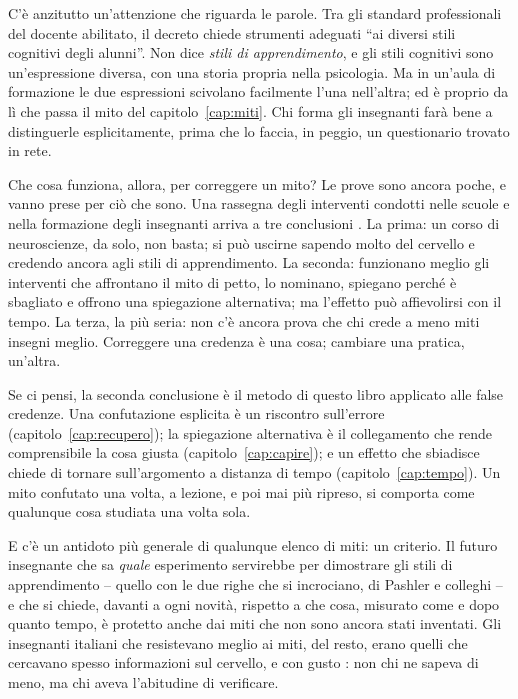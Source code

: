 C'è anzitutto un'attenzione che riguarda le parole. Tra gli standard
professionali del docente abilitato, il decreto chiede strumenti
adeguati \enquote{ai diversi stili cognitivi degli alunni}. Non dice
\emph{stili di apprendimento}, e gli stili cognitivi sono
un'espressione diversa, con una storia propria nella psicologia. Ma in
un'aula di formazione le due espressioni scivolano facilmente l'una
nell'altra; ed è proprio da lì che passa il mito del
capitolo~\ref{cap:miti}. Chi forma gli insegnanti farà bene a
distinguerle esplicitamente, prima che lo faccia, in peggio, un
questionario trovato in rete.

Che cosa funziona, allora, per correggere un mito? Le prove sono
ancora poche, e vanno prese per ciò che sono. Una rassegna degli
interventi condotti nelle scuole e nella formazione degli insegnanti
arriva a tre conclusioni \parencite{rousseau2021}. La prima: un corso
di neuroscienze, da solo, non basta; si può uscirne sapendo molto del
cervello e credendo ancora agli stili di apprendimento. La seconda:
funzionano meglio gli interventi che affrontano il mito di petto, lo
nominano, spiegano perché è sbagliato e offrono una spiegazione
alternativa; ma l'effetto può affievolirsi con il tempo. La terza, la
più seria: non c'è ancora prova che chi crede a meno miti insegni
meglio. Correggere una credenza è una cosa; cambiare una pratica,
un'altra.

Se ci pensi, la seconda conclusione è il metodo di questo libro
applicato alle false credenze. Una confutazione esplicita è un
riscontro sull'errore (capitolo~\ref{cap:recupero}); la spiegazione
alternativa è il collegamento che rende comprensibile la cosa giusta
(capitolo~\ref{cap:capire}); e un effetto che sbiadisce chiede di
tornare sull'argomento a distanza di tempo (capitolo~\ref{cap:tempo}).
Un mito confutato una volta, a lezione, e poi mai più ripreso, si
comporta come qualunque cosa studiata una volta sola.

E c'è un antidoto più generale di qualunque elenco di miti: un
criterio. Il futuro insegnante che sa \emph{quale} esperimento
servirebbe per dimostrare gli stili di apprendimento -- quello con le
due righe che si incrociano, di Pashler e colleghi
\parencite{pashler2008} -- e che si chiede, davanti a ogni novità,
rispetto a che cosa, misurato come e dopo quanto tempo, è protetto
anche dai miti che non sono ancora stati inventati. Gli insegnanti
italiani che resistevano meglio ai miti, del resto, erano quelli che
cercavano spesso informazioni sul cervello, e con gusto
\parencite{bei2023}: non chi ne sapeva di meno, ma chi aveva
l'abitudine di verificare.

